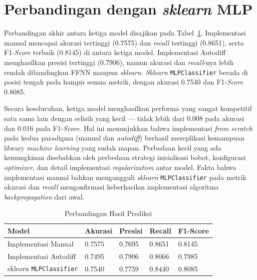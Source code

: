 \section{Perbandingan dengan \textit{sklearn} MLP}

Perbandingan akhir antara ketiga model disajikan pada Tabel~\ref{tab:sklearn}. Implementasi manual mencapai akurasi tertinggi (0.7575) dan \textit{recall} tertinggi (0.8651), serta F1-\textit{Score} terbaik (0.8145) di antara ketiga model. Implementasi Autodiff menghasilkan presisi tertinggi (0.7906), namun akurasi dan \textit{recall}-nya lebih rendah dibandingkan FFNN maupun \textit{sklearn}. \textit{Sklearn} \texttt{MLPClassifier} berada di posisi tengah pada hampir semua metrik, dengan akurasi 0.7540 dan F1-\textit{Score} 0.8085.

Secara keseluruhan, ketiga model menghasilkan performa yang sangat kompetitif satu sama lain dengan selisih yang kecil — tidak lebih dari 0.008 pada akurasi dan 0.016 pada F1-\textit{Score}. Hal ini menunjukkan bahwa implementasi \textit{from scratch} pada kedua paradigma (manual dan \textit{autodiff}) berhasil mereplikasi kemampuan library \textit{machine learning} yang sudah mapan. Perbedaan kecil yang ada kemungkinan disebabkan oleh perbedaan strategi inisialisasi bobot, konfigurasi \textit{optimizer}, dan detail implementasi \textit{regularization} antar model. Fakta bahwa implementasi manual bahkan mengungguli \textit{sklearn} \texttt{MLPClassifier} pada metrik akurasi dan \textit{recall} mengonfirmasi keberhasilan implementasi algoritma \textit{backpropagation} dari awal.

\begin{table}[H]
    \centering
    \caption{Perbandingan Hasil Prediksi}
    \begin{tabular}{lllll}
        \toprule
        \textbf{Model} & \textbf{Akurasi} & \textbf{Presisi} & \textbf{Recall} & \textbf{F1-Score} \\
        \midrule
        Implementasi Manual    & 0.7575 & 0.7695 & 0.8651 & 0.8145 \\
        Implementasi Autodiff  & 0.7495 & 0.7906 & 0.8066 & 0.7985 \\
        sklearn \texttt{MLPClassifier} & 0.7540 & 0.7759 & 0.8440 & 0.8085 \\
        \bottomrule
    \end{tabular}
    \label{tab:sklearn}
\end{table}